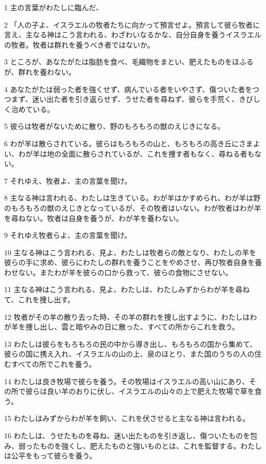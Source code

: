 \par 1 主の言葉がわたしに臨んだ、
\par 2 「人の子よ、イスラエルの牧者たちに向かって預言せよ。預言して彼ら牧者に言え、主なる神はこう言われる、わざわいなるかな、自分自身を養うイスラエルの牧者。牧者は群れを養うべき者ではないか。
\par 3 ところが、あなたがたは脂肪を食べ、毛織物をまとい、肥えたものをほふるが、群れを養わない。
\par 4 あなたがたは弱った者を強くせず、病んでいる者をいやさず、傷ついた者をつつまず、迷い出た者を引き返らせず、うせた者を尋ねず、彼らを手荒く、きびしく治めている。
\par 5 彼らは牧者がないために散り、野のもろもろの獣のえじきになる。
\par 6 わが羊は散らされている。彼らはもろもろの山と、もろもろの高き丘にさまよい、わが羊は地の全面に散らされているが、これを捜す者もなく、尋ねる者もない。
\par 7 それゆえ、牧者よ、主の言葉を聞け。
\par 8 主なる神は言われる、わたしは生きている。わが羊はかすめられ、わが羊は野のもろもろの獣のえじきとなっているが、その牧者はいない。わが牧者はわが羊を尋ねない。牧者は自身を養うが、わが羊を養わない。
\par 9 それゆえ牧者らよ、主の言葉を聞け。
\par 10 主なる神はこう言われる、見よ、わたしは牧者らの敵となり、わたしの羊を彼らの手に求め、彼らにわたしの群れを養うことをやめさせ、再び牧者自身を養わせない。またわが羊を彼らの口から救って、彼らの食物にさせない。
\par 11 主なる神はこう言われる、見よ、わたしは、わたしみずからわが羊を尋ねて、これを捜し出す。
\par 12 牧者がその羊の散り去った時、その羊の群れを捜し出すように、わたしはわが羊を捜し出し、雲と暗やみの日に散った、すべての所からこれを救う。
\par 13 わたしは彼らをもろもろの民の中から導き出し、もろもろの国から集めて、彼らの国に携え入れ、イスラエルの山の上、泉のほとり、また国のうちの人の住むすべての所でこれを養う。
\par 14 わたしは良き牧場で彼らを養う。その牧場はイスラエルの高い山にあり、その所で彼らは良い羊のおりに伏し、イスラエルの山々の上で肥えた牧場で草を食う。
\par 15 わたしはみずからわが羊を飼い、これを伏させると主なる神は言われる。
\par 16 わたしは、うせたものを尋ね、迷い出たものを引き返し、傷ついたものを包み、弱ったものを強くし、肥えたものと強いものとは、これを監督する。わたしは公平をもって彼らを養う。
